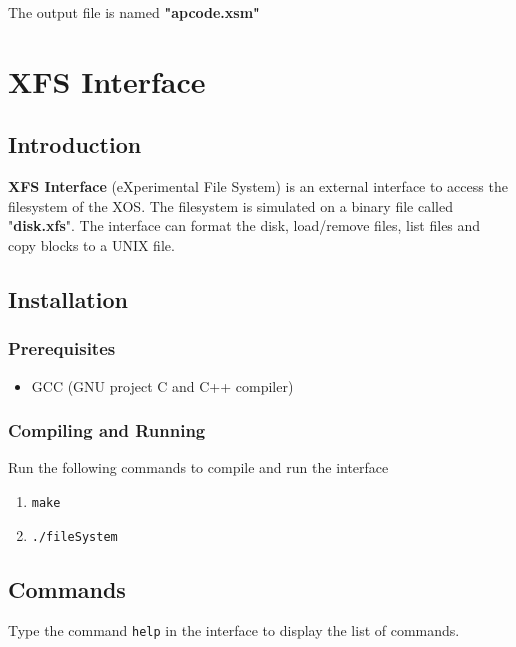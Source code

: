 \documentclass[11pt]{report}
\begin{document}
The output file is named \textbf{"apcode.xsm"}

\chapter{XFS Interface}

\section{Introduction}
\textbf{XFS Interface} (eXperimental File System) is an external interface to access the filesystem of the XOS. The filesystem is simulated on a binary file called "\textbf{disk.xfs}". The interface can format the disk, load/remove files, list files and copy blocks to a UNIX file.

\section{Installation}
\subsection{Prerequisites}
\begin{itemize}
	\item GCC (GNU project C and C++ compiler)
\end{itemize}

%

\subsection{Compiling and Running}
Run the following commands to compile and run the interface
\begin{enumerate}
		\item \texttt{make}
		\item \texttt{./fileSystem}
\end{enumerate}

\section{Commands}
Type the command \texttt{help} in the interface to display the list of commands.
\end{document}
